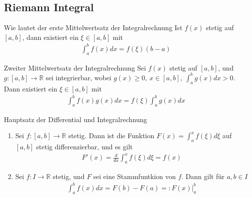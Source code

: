 \subsection{Riemann Integral}

\begin{karte}{Wie lautet der erste Mittelwertsatz der Integralrechnung}
	Ist \(f(x)\) stetig auf \([a,b]\), dann existiert ein \(\xi\in[a,b]\) mit
	\begin{align}
		\int_{a}^{b}f(x)dx=f(\xi)(b-a) 
	\end{align}
\end{karte}

\begin{karte}{Zweiter Mittelwertsatz der Integralrechnung}
	Sei \(f(x)\) stetig auf \([a,b]\), und \(g:[a,b]\to \mathbb{R}\) sei integrierbar, wobei \(g(x)\geq0,\ x\in[a,b],\ \int_{a}^{b} g(x)dx>0\). Dann existiert ein \(\xi\in[a,b]\) mit
	\begin{align}
		\int_{a}^{b} f(x)g(x)dx=f(\xi)\int_{a}^{b} g(x)dx 
	\end{align}
\end{karte}


\begin{karte}{Hauptsatz der Differential und Integralrechnung}
	\begin{enumerate}[label= (\roman*)]
		
		\item Sei \(f:[a,b] \to \mathbb{R}\) stetig. Dann ist die Funktion \(F(x) = \int_a^x f(\xi)d\xi \) auf \([a,b]\) stetig differenzierbar, und es gilt
		      \begin{align}
		      	F'(x) = \frac{d}{dx} \int_a^x f(\xi)d\xi=f(x) 
		      \end{align}
		      
		\item Sei \(f: I \to \mathbb{R}\) stetig, und \(F\) sei eine Stammfuntkion von \(f\). Dann gilt für \(a,b \in I\)
		      \begin{align}
		      	\int_a^b f(x)dx = F(b) - F(a) =: F(x)|_a^b 
		      \end{align}
	\end{enumerate}
\end{karte}
